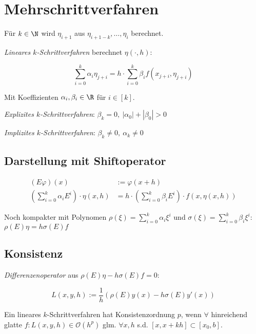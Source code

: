 \section*{Mehrschrittverfahren}

Für $k \in \N$ wird $\eta_{i+1}$ aus $\eta_{i+1-k},\dots,\eta_i$ berechnet.

\emph{Lineares $k$-Schrittverfahren} berechnet $\eta(\cdot,h)$:

\vspace*{-2mm}
\[ \sum_{i=0}^k \alpha_i \eta_{j+i} = h \cdot \sum_{i=0}^k \beta_i f(x_{j+i},\eta_{j+i}) \]

Mit Koeffizienten $\alpha_i, \beta_i \in \R$ für $i \in [k]$.

\spacing

\emph{Explizites $k$-Schrittverfahren}: $\beta_k = 0, \ |\alpha_0|+|\beta_0| > 0$

\emph{Implizites $k$-Schrittverfahren}: $\beta_k \neq 0, \ \alpha_k \neq 0$

\subsection*{Darstellung mit Shiftoperator}

\vspace*{-4mm}
\begin{align*}
(E\varphi)(x) &:= \varphi(x+h) \\
\left(\sum_{i=0}^k \alpha_i E^i\right) \cdot \eta(x,h) &= h \cdot \left(\sum_{i=0}^k \beta_i  E^i\right) \cdot f(x,\eta(x,h))
\end{align*}

Noch kompakter mit Polynomen $\rho(\xi) = \sum_{i=0}^k \alpha_i \xi^i$ und $\sigma(\xi) = \sum_{i=0}^k \beta_i \xi^i$: $\rho(E)\eta = h \sigma(E) f$

\subsection*{Konsistenz}

\emph{Differenzenoperator} aus $\rho(E)\eta - h\sigma(E)f = 0$:

\vspace*{-2mm}
\[ L(x,y,h) := \frac{1}{h}\left(\rho(E)y(x) - h\sigma(E)y'(x)\right) \]

Ein lineares $k$-Schrittverfahren hat Konsistenzordnung $p$, wenn $\forall$ hinreichend glatte $f : L(x,y,h) \in \mathcal{O}(h^p)$ glm. $\forall x, h$ s.d. $[x,x+kh] \subset [x_0,b]$.

\spacing

